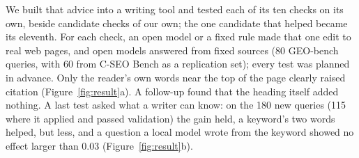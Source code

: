 We built that advice into a writing tool and tested each of its ten checks on its own, beside candidate checks of our own; the one candidate that helped became its eleventh.
For each check, an open model or a fixed rule made that one edit to real web pages, and open models answered from fixed sources (80 GEO-bench queries, with 60 from C-SEO Bench as a replication set); every test was planned in advance.
Only the reader's own words near the top of the page clearly raised citation (Figure~\ref{fig:result}a).
A follow-up found that the heading itself added nothing.
A last test asked what a writer can know: on the 180 new queries (115 where it applied and passed validation) the gain held, a keyword's two words helped, but less, and a question a local model wrote from the keyword showed no effect larger than 0.03 (Figure~\ref{fig:result}b).

